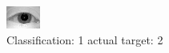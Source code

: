 \begin{figure}[h!]
\begin{center}
\includegraphics[width=0.60\columnwidth]{figures/ID1022_class_1_target_2.png}
\end{center}
\caption{ Classification: 1 actual target: 2}
\label{fig:ID1022_class_1_target_2}
\end{figure}
